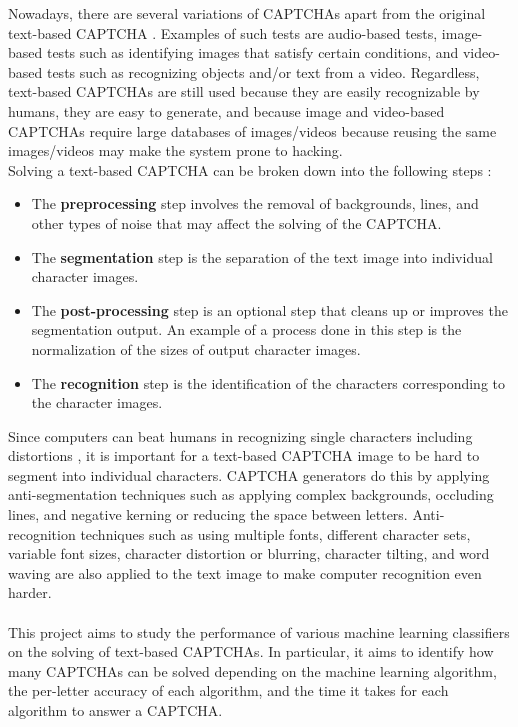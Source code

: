 \documentclass[conference,compsoc]{IEEEtran}
\begin{document}
\indent Nowadays, there are several variations of CAPTCHAs apart from the original text-based CAPTCHA \cite{jeng10}. Examples of such tests are audio-based tests, image-based tests such as identifying images that satisfy certain conditions, and video-based tests such as recognizing objects and/or text from a video. Regardless, text-based CAPTCHAs are still used because they are easily recognizable by humans, they are easy to generate, and because image and video-based CAPTCHAs require large databases of images/videos because reusing the same images/videos may make the system prone to hacking.\\

\indent Solving a text-based CAPTCHA can be broken down into the following steps \cite{bursztein11}:
\begin{itemize}[\topsep=0pt]
  \item The \textbf{preprocessing} step involves the removal of backgrounds, lines, and other types of noise that may affect the solving of the CAPTCHA.
  \item The \textbf{segmentation} step is the separation of the text image into individual character images.
  \item The \textbf{post-processing} step is an optional step that cleans up or improves the segmentation output. An example of a process done in this step is the normalization of the sizes of output character images.
  \item The \textbf{recognition} step is the identification of the characters corresponding to the character images.
\end{itemize} 
Since computers can beat humans in recognizing single characters including distortions \cite{chellapilla05}, it is important for a text-based CAPTCHA image to be hard to segment into individual characters. CAPTCHA generators do this by applying anti-segmentation techniques \cite{bursztein11} such as applying complex backgrounds, occluding lines, and negative kerning or reducing the space between letters. Anti-recognition techniques such as using multiple fonts, different character sets, variable font sizes, character distortion or blurring, character tilting, and word waving are also applied to the text image to make computer recognition even harder.\\

 \\

\indent This project aims to study the performance of various machine learning classifiers on the solving of text-based CAPTCHAs. In particular, it aims to identify how many CAPTCHAs can be solved depending on the machine learning algorithm, the per-letter accuracy of each algorithm, and the time it takes for each algorithm to answer a CAPTCHA.
\end{document}
